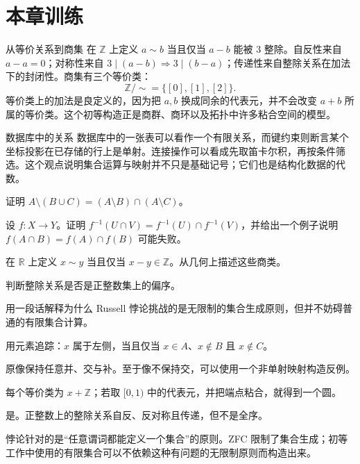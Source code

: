 \section{本章训练}

\begin{workedexample}{从等价关系到商集}
在 $\mathbb{Z}$ 上定义 $a\sim b$ 当且仅当 $a-b$ 能被 $3$ 整除。自反性来自 $a-a=0$；对称性来自 $3\mid(a-b)\Rightarrow3\mid(b-a)$；传递性来自整除关系在加法下的封闭性。商集有三个等价类：
\[
    \mathbb{Z}/\!\sim=\{[0],[1],[2]\}.
\]
等价类上的加法是良定义的，因为把 $a,b$ 换成同余的代表元，并不会改变 $a+b$ 所属的等价类。这个初等构造正是商群、商环以及拓扑中许多粘合空间的模型。
\end{workedexample}

\begin{applicationbox}{数据库中的关系}
数据库中的一张表可以看作一个有限关系，而键约束则断言某个坐标投影在已存储的行上是单射。连接操作可以看成先取笛卡尔积，再按条件筛选。这个观点说明集合运算与映射并不只是基础记号；它们也是结构化数据的代数。
\end{applicationbox}

\begin{chapterexercises}
    \item 证明 $A\setminus(B\cup C)=(A\setminus B)\cap(A\setminus C)$。
    \item 设 $f:X\to Y$。证明 $f^{-1}(U\cap V)=f^{-1}(U)\cap f^{-1}(V)$，并给出一个例子说明 $f(A\cap B)=f(A)\cap f(B)$ 可能失败。
    \item 在 $\mathbb{R}$ 上定义 $x\sim y$ 当且仅当 $x-y\in\mathbb{Z}$。从几何上描述这些商类。
    \item 判断整除关系是否是正整数集上的偏序。
    \item 用一段话解释为什么 Russell 悖论挑战的是无限制的集合生成原则，但并不妨碍普通的有限集合计算。
\end{chapterexercises}

\begin{selectedhints}
    \item 用元素追踪：$x$ 属于左侧，当且仅当 $x\in A$、$x\notin B$ 且 $x\notin C$。
    \item 原像保持任意并、交与补。至于像不保持交，可以使用一个非单射映射构造反例。
    \item 每个等价类为 $x+\mathbb{Z}$；若取 $[0,1)$ 中的代表元，并把端点粘合，就得到一个圆。
    \item 是。正整数上的整除关系自反、反对称且传递，但不是全序。
    \item 悖论针对的是“任意谓词都能定义一个集合”的原则。ZFC 限制了集合生成；初等工作中使用的有限集合可以不依赖这种有问题的无限制原则而构造出来。
\end{selectedhints}

